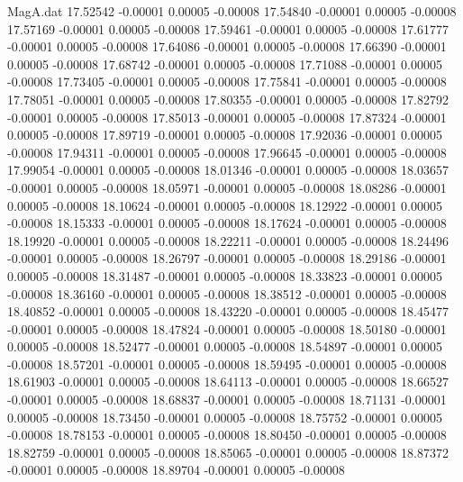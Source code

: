 \begin{filecontents}{MagA.dat}
  17.52542   -0.00001    0.00005   -0.00008
  17.54840   -0.00001    0.00005   -0.00008
  17.57169   -0.00001    0.00005   -0.00008
  17.59461   -0.00001    0.00005   -0.00008
  17.61777   -0.00001    0.00005   -0.00008
  17.64086   -0.00001    0.00005   -0.00008
  17.66390   -0.00001    0.00005   -0.00008
  17.68742   -0.00001    0.00005   -0.00008
  17.71088   -0.00001    0.00005   -0.00008
  17.73405   -0.00001    0.00005   -0.00008
  17.75841   -0.00001    0.00005   -0.00008
  17.78051   -0.00001    0.00005   -0.00008
  17.80355   -0.00001    0.00005   -0.00008
  17.82792   -0.00001    0.00005   -0.00008
  17.85013   -0.00001    0.00005   -0.00008
  17.87324   -0.00001    0.00005   -0.00008
  17.89719   -0.00001    0.00005   -0.00008
  17.92036   -0.00001    0.00005   -0.00008
  17.94311   -0.00001    0.00005   -0.00008
  17.96645   -0.00001    0.00005   -0.00008
  17.99054   -0.00001    0.00005   -0.00008
  18.01346   -0.00001    0.00005   -0.00008
  18.03657   -0.00001    0.00005   -0.00008
  18.05971   -0.00001    0.00005   -0.00008
  18.08286   -0.00001    0.00005   -0.00008
  18.10624   -0.00001    0.00005   -0.00008
  18.12922   -0.00001    0.00005   -0.00008
  18.15333   -0.00001    0.00005   -0.00008
  18.17624   -0.00001    0.00005   -0.00008
  18.19920   -0.00001    0.00005   -0.00008
  18.22211   -0.00001    0.00005   -0.00008
  18.24496   -0.00001    0.00005   -0.00008
  18.26797   -0.00001    0.00005   -0.00008
  18.29186   -0.00001    0.00005   -0.00008
  18.31487   -0.00001    0.00005   -0.00008
  18.33823   -0.00001    0.00005   -0.00008
  18.36160   -0.00001    0.00005   -0.00008
  18.38512   -0.00001    0.00005   -0.00008
  18.40852   -0.00001    0.00005   -0.00008
  18.43220   -0.00001    0.00005   -0.00008
  18.45477   -0.00001    0.00005   -0.00008
  18.47824   -0.00001    0.00005   -0.00008
  18.50180   -0.00001    0.00005   -0.00008
  18.52477   -0.00001    0.00005   -0.00008
  18.54897   -0.00001    0.00005   -0.00008
  18.57201   -0.00001    0.00005   -0.00008
  18.59495   -0.00001    0.00005   -0.00008
  18.61903   -0.00001    0.00005   -0.00008
  18.64113   -0.00001    0.00005   -0.00008
  18.66527   -0.00001    0.00005   -0.00008
  18.68837   -0.00001    0.00005   -0.00008
  18.71131   -0.00001    0.00005   -0.00008
  18.73450   -0.00001    0.00005   -0.00008
  18.75752   -0.00001    0.00005   -0.00008
  18.78153   -0.00001    0.00005   -0.00008
  18.80450   -0.00001    0.00005   -0.00008
  18.82759   -0.00001    0.00005   -0.00008
  18.85065   -0.00001    0.00005   -0.00008
  18.87372   -0.00001    0.00005   -0.00008
  18.89704   -0.00001    0.00005   -0.00008

\end{filecontents}

